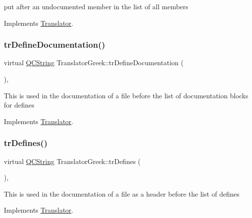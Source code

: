 put after an undocumented member in the list of all members 

Implements \mbox{\hyperlink{class_translator}{Translator}}.

\mbox{\label{class_translator_greek_a7126098408e67d0ba77d683cb85e2384}} 
\subsubsection{\texorpdfstring{trDefineDocumentation()}{trDefineDocumentation()}}
{\footnotesize\ttfamily virtual \mbox{\hyperlink{class_q_c_string}{Q\+C\+String}} Translator\+Greek\+::tr\+Define\+Documentation (\begin{DoxyParamCaption}{ }\end{DoxyParamCaption})\hspace{0.3cm}{\ttfamily [inline]}, {\ttfamily [virtual]}}

This is used in the documentation of a file before the list of documentation blocks for defines 

Implements \mbox{\hyperlink{class_translator}{Translator}}.

\mbox{\label{class_translator_greek_aa76fcea9156eb62e7f8bc9f5017ab458}} 
\subsubsection{\texorpdfstring{trDefines()}{trDefines()}}
{\footnotesize\ttfamily virtual \mbox{\hyperlink{class_q_c_string}{Q\+C\+String}} Translator\+Greek\+::tr\+Defines (\begin{DoxyParamCaption}{ }\end{DoxyParamCaption})\hspace{0.3cm}{\ttfamily [inline]}, {\ttfamily [virtual]}}

This is used in the documentation of a file as a header before the list of defines 

Implements \mbox{\hyperlink{class_translator}{Translator}}.

\mbox{\label{class_translator_greek_a6ed8fdfda39fe8f43341cd81817c3ad0}} 
